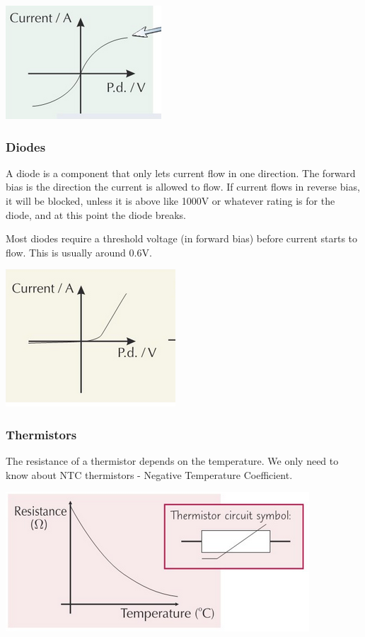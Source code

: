 \documentclass[a4paper, 12pt]{article}
\begin{document}
\begin{center}
\includegraphics[]{images/bulbIV.png}
\end{center}

\subsubsection{Diodes}

A diode is a component that only lets current flow in one direction. The forward bias is the direction the current is allowed to flow. If current flows in reverse bias, it will be blocked, unless it is above like 1000V or whatever rating is for the diode, and at this point the diode breaks. 

Most diodes require a threshold voltage (in forward bias) before current starts to flow. This is usually around 0.6V.

\begin{center}
\includegraphics[]{images/diodeIV.png}
\end{center}

\subsubsection{Thermistors}

The resistance of a thermistor depends on the temperature. We only need to know about NTC thermistors - Negative Temperature Coefficient.

\begin{center}
\includegraphics[]{images/thermistor.png}
\end{center}
\end{document}
